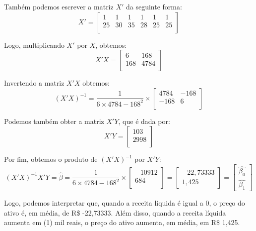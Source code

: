 \documentclass[]{ufpe-exercises}
\begin{document}
\begin{questions}
\begin{parts}
\begin{solution}
			Também podemos escrever a matriz \(X'\) da seguinte forma:
			\[
				X' =
				\begin{bmatrix}
					1  & 1  & 1  & 1  & 1  & 1  \\
					25 & 30 & 35 & 28 & 25 & 25 \\
				\end{bmatrix}
			\]

			Logo, multiplicando \(X'\) por \(X\), obtemos:
			\[
				X'X =
				\begin{bmatrix}
					6   & 168  \\
					168 & 4784 \\
				\end{bmatrix}
			\]

			Invertendo a matriz \(X'X\) obtemos:
			\[
				(X'X)^{-1} = \frac{1}{6 \times 4784 - 168^2} \times
				\begin{bmatrix}
					4784 & -168 \\
					-168 & 6    \\
				\end{bmatrix}
			\]

			Podemos também obter a matriz \(X'Y\), que é dada por:
			\[
				X'Y =
				\begin{bmatrix}
					103  \\
					2998 \\
				\end{bmatrix}
			\]

			Por fim, obtemos o produto de \((X'X)^{-1}\) por \(X'Y\):
			\[
				(X'X)^{-1}X'Y = \hat{\beta} =	\frac{1}{6 \times 4784 - 168^2} \times \begin{bmatrix}
					-10912 \\
					684    \\
				\end{bmatrix} =
				\begin{bmatrix}
					-22,73333 \\
					1,425
				\end{bmatrix} =
				\begin{bmatrix}
					\hat{\beta_{0}} \\
					\hat{\beta_{1}}
				\end{bmatrix}
			\]

			Logo, podemos interpretar que, quando a receita líquida é igual a 0, o preço do ativo é, em média, de R\$ -22,73333. Além disso, quando a receita líquida aumenta em (1) mil reais, o preço do ativo aumenta, em média, em R\$ 1,425.

		\end{solution}


\end{parts}
\end{questions}
\end{document}
